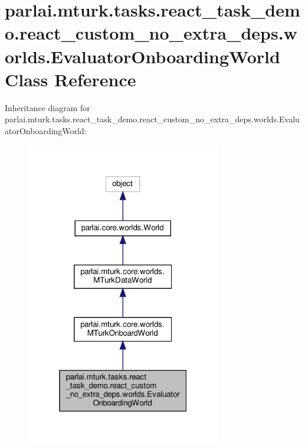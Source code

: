 \hypertarget{classparlai_1_1mturk_1_1tasks_1_1react__task__demo_1_1react__custom__no__extra__deps_1_1worlds_1_1EvaluatorOnboardingWorld}{}\section{parlai.\+mturk.\+tasks.\+react\+\_\+task\+\_\+demo.\+react\+\_\+custom\+\_\+no\+\_\+extra\+\_\+deps.\+worlds.\+Evaluator\+Onboarding\+World Class Reference}
\label{classparlai_1_1mturk_1_1tasks_1_1react__task__demo_1_1react__custom__no__extra__deps_1_1worlds_1_1EvaluatorOnboardingWorld}


Inheritance diagram for parlai.\+mturk.\+tasks.\+react\+\_\+task\+\_\+demo.\+react\+\_\+custom\+\_\+no\+\_\+extra\+\_\+deps.\+worlds.\+Evaluator\+Onboarding\+World\+:
\nopagebreak
\begin{figure}[H]
\begin{center}
\leavevmode
\includegraphics[width=241pt]{classparlai_1_1mturk_1_1tasks_1_1react__task__demo_1_1react__custom__no__extra__deps_1_1worlds_1f8c95c369f397ecb6c37a1609505734e}
\end{center}
\end{figure}



